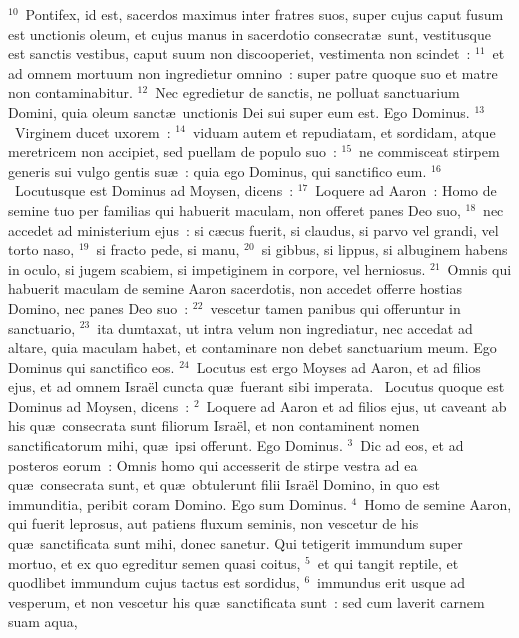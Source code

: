 ${}^{10}$~Pontifex, id est, sacerdos maximus inter fratres suos, super cujus caput fusum est unctionis oleum, et cujus manus in sacerdotio consecrat\ae\ sunt, vestitusque est sanctis vestibus, caput suum non discooperiet, vestimenta non scindet~:
${}^{11}$~et ad omnem mortuum non ingredietur omnino~: super patre quoque suo et matre non contaminabitur.
${}^{12}$~Nec egredietur de sanctis, ne polluat sanctuarium Domini, quia oleum sanct\ae\ unctionis Dei sui super eum est. Ego Dominus.
${}^{13}$~Virginem ducet uxorem~:
${}^{14}$~viduam autem et repudiatam, et sordidam, atque meretricem non accipiet, sed puellam de populo suo~:
${}^{15}$~ne commisceat stirpem generis sui vulgo gentis su\ae~: quia ego Dominus, qui sanctifico eum.
${}^{16}$~Locutusque est Dominus ad Moysen, dicens~:
${}^{17}$~Loquere ad Aaron~: Homo de semine tuo per familias qui habuerit maculam, non offeret panes Deo suo,
${}^{18}$~nec accedet ad ministerium ejus~: si c\ae cus fuerit, si claudus, si parvo vel grandi, vel torto naso,
${}^{19}$~si fracto pede, si manu,
${}^{20}$~si gibbus, si lippus, si albuginem habens in oculo, si jugem scabiem, si impetiginem in corpore, vel herniosus.
${}^{21}$~Omnis qui habuerit maculam de semine Aaron sacerdotis, non accedet offerre hostias Domino, nec panes Deo suo~:
${}^{22}$~vescetur tamen panibus qui offeruntur in sanctuario,
${}^{23}$~ita dumtaxat, ut intra velum non ingrediatur, nec accedat ad altare, quia maculam habet, et contaminare non debet sanctuarium meum. Ego Dominus qui sanctifico eos.
${}^{24}$~Locutus est ergo Moyses ad Aaron, et ad filios ejus, et ad omnem Isra\"el cuncta qu\ae\ fuerant sibi imperata.
~\lettrine[lines=10,image=true,loversize=0.05,lraise=-0.03]{L}{}ocutus quoque est Dominus ad Moysen, dicens~:
${}^{2}$~Loquere ad Aaron et ad filios ejus, ut caveant ab his qu\ae\ consecrata sunt filiorum Isra\"el, et non contaminent nomen sanctificatorum mihi, qu\ae\ ipsi offerunt. Ego Dominus.
${}^{3}$~Dic ad eos, et ad posteros eorum~: Omnis homo qui accesserit de stirpe vestra ad ea qu\ae\ consecrata sunt, et qu\ae\ obtulerunt filii Isra\"el Domino, in quo est immunditia, peribit coram Domino. Ego sum Dominus.
${}^{4}$~Homo de semine Aaron, qui fuerit leprosus, aut patiens fluxum seminis, non vescetur de his qu\ae\ sanctificata sunt mihi, donec sanetur. Qui tetigerit immundum super mortuo, et ex quo egreditur semen quasi coitus,
${}^{5}$~et qui tangit reptile, et quodlibet immundum cujus tactus est sordidus,
${}^{6}$~immundus erit usque ad vesperum, et non vescetur his qu\ae\ sanctificata sunt~: sed cum laverit carnem suam aqua,
